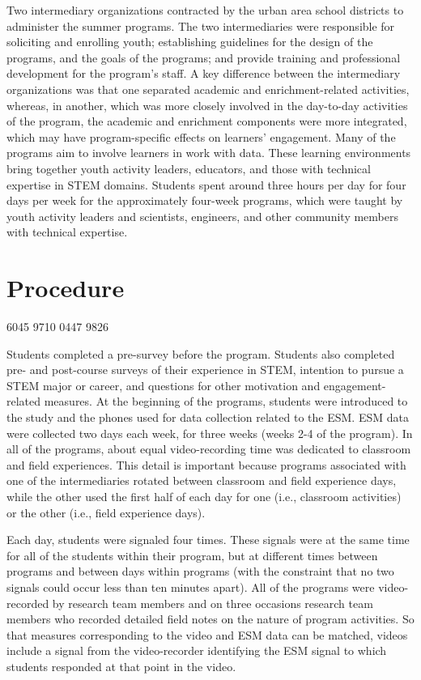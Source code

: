\documentclass[]{msu-thesis}
\theoremstyle{definition}
\theoremstyle{definition}
\theoremstyle{definition}
\theoremstyle{remark}
\begin{document}
Two intermediary organizations contracted by the urban area school
districts to administer the summer programs. The two intermediaries were
responsible for soliciting and enrolling youth; establishing guidelines
for the design of the programs, and the goals of the programs; and
provide training and professional development for the program's staff. A
key difference between the intermediary organizations was that one
separated academic and enrichment-related activities, whereas, in
another, which was more closely involved in the day-to-day activities of
the program, the academic and enrichment components were more
integrated, which may have program-specific effects on learners'
engagement. Many of the programs aim to involve learners in work with
data. These learning environments bring together youth activity leaders,
educators, and those with technical expertise in STEM domains. Students
spent around three hours per day for four days per week for the
approximately four-week programs, which were taught by youth activity
leaders and scientists, engineers, and other community members with
technical expertise.

\section{Procedure}\label{procedure}

6045 9710 0447 9826

Students completed a pre-survey before the program. Students also
completed pre- and post-course surveys of their experience in STEM,
intention to pursue a STEM major or career, and questions for other
motivation and engagement-related measures. At the beginning of the
programs, students were introduced to the study and the phones used for
data collection related to the ESM. ESM data were collected two days
each week, for three weeks (weeks 2-4 of the program). In all of the
programs, about equal video-recording time was dedicated to classroom
and field experiences. This detail is important because programs
associated with one of the intermediaries rotated between classroom and
field experience days, while the other used the first half of each day
for one (i.e., classroom activities) or the other (i.e., field
experience days).

Each day, students were signaled four times. These signals were at the
same time for all of the students within their program, but at different
times between programs and between days within programs (with the
constraint that no two signals could occur less than ten minutes apart).
All of the programs were video-recorded by research team members and on
three occasions research team members who recorded detailed field notes
on the nature of program activities. So that measures corresponding to
the video and ESM data can be matched, videos include a signal from the
video-recorder identifying the ESM signal to which students responded at
that point in the video.
\end{document}
